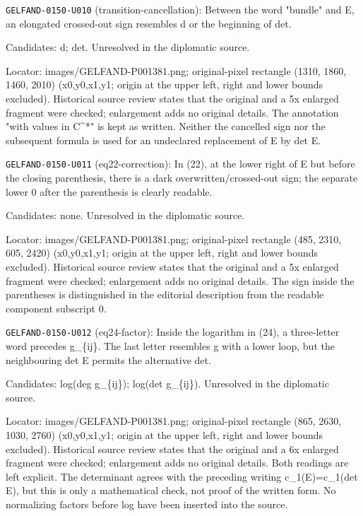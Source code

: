 \noindent\texttt{GELFAND-0150-U010} (transition-cancellation): Between the word "bundle" and E, an elongated crossed-out sign resembles d or the beginning of det.\par
Candidates: d; det. Unresolved in the diplomatic source.\par
Locator: images/GELFAND-P001381.png; original-pixel rectangle (1310, 1860, 1460, 2010) (x0,y0,x1,y1; origin at the upper left, right and lower bounds excluded). Historical source review states that the original and a 5x enlarged fragment were checked; enlargement adds no original details. The annotation "with values in C\textasciicircum{}*" is kept as written. Neither the cancelled sign nor the subsequent formula is used for an undeclared replacement of E by det E.\par

\noindent\texttt{GELFAND-0150-U011} (eq22-correction): In (22), at the lower right of E but before the closing parenthesis, there is a dark overwritten/crossed-out sign; the separate lower 0 after the parenthesis is clearly readable.\par
Candidates: none. Unresolved in the diplomatic source.\par
Locator: images/GELFAND-P001381.png; original-pixel rectangle (485, 2310, 605, 2420) (x0,y0,x1,y1; origin at the upper left, right and lower bounds excluded). Historical source review states that the original and a 5x enlarged fragment were checked; enlargement adds no original details. The sign inside the parentheses is distinguished in the editorial description from the readable component subscript 0.\par

\noindent\texttt{GELFAND-0150-U012} (eq24-factor): Inside the logarithm in (24), a three-letter word precedes g\_\{ij\}. The last letter resembles g with a lower loop, but the neighbouring det E permits the alternative det.\par
Candidates: log(deg g\_\{ij\}); log(det g\_\{ij\}). Unresolved in the diplomatic source.\par
Locator: images/GELFAND-P001381.png; original-pixel rectangle (865, 2630, 1030, 2760) (x0,y0,x1,y1; origin at the upper left, right and lower bounds excluded). Historical source review states that the original and a 6x enlarged fragment were checked; enlargement adds no original details. Both readings are left explicit. The determinant agrees with the preceding writing c\_1(E)=c\_1(det E), but this is only a mathematical check, not proof of the written form. No normalizing factors before log have been inserted into the source.\par

